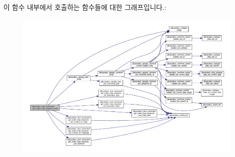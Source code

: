 이 함수 내부에서 호출하는 함수들에 대한 그래프입니다.\+:
\nopagebreak
\begin{figure}[H]
\begin{center}
\leavevmode
\includegraphics[width=350pt]{group__command__get__audio__map__response_ga6c90983c36ab94e4d3e15193dfcb2aa5_cgraph}
\end{center}
\end{figure}


